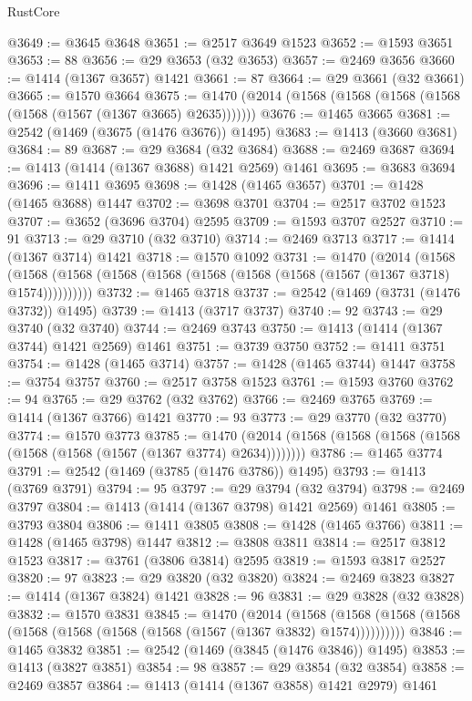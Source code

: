 \begin{lexlean}{RustCore}
\begin{coremodule}
{\begin{coremodule}
{{{{{{{{{{{{{{{{{{{{{{{{{{{{{{{{{{{{{{{{{{{{{{{@3649 := @3645 @3648
@3651 := @2517 @3649 @1523
@3652 := @1593 @3651
@3653 := 88
@3656 := @29 @3653 (@32 @3653)
@3657 := @2469 @3656
@3660 := @1414 (@1367 @3657) @1421
@3661 := 87
@3664 := @29 @3661 (@32 @3661)
@3665 := @1570 @3664
@3675 := @1470 (@2014 (@1568 (@1568 (@1568 (@1568 (@1568 (@1567 (@1367 @3665) @2635)))))))
@3676 := @1465 @3665
@3681 := @2542 (@1469 (@3675 (@1476 @3676)) @1495)
@3683 := @1413 (@3660 @3681)
@3684 := 89
@3687 := @29 @3684 (@32 @3684)
@3688 := @2469 @3687
@3694 := @1413 (@1414 (@1367 @3688) @1421 @2569) @1461
@3695 := @3683 @3694
@3696 := @1411 @3695
@3698 := @1428 (@1465 @3657)
@3701 := @1428 (@1465 @3688) @1447
@3702 := @3698 @3701
@3704 := @2517 @3702 @1523
@3707 := @3652 (@3696 @3704) @2595
@3709 := @1593 @3707 @2527
@3710 := 91
@3713 := @29 @3710 (@32 @3710)
@3714 := @2469 @3713
@3717 := @1414 (@1367 @3714) @1421
@3718 := @1570 @1092
@3731 := @1470
    (@2014
      (@1568 (@1568 (@1568 (@1568 (@1568 (@1568 (@1568 (@1568 (@1567 (@1367 @3718) @1574))))))))))
@3732 := @1465 @3718
@3737 := @2542 (@1469 (@3731 (@1476 @3732)) @1495)
@3739 := @1413 (@3717 @3737)
@3740 := 92
@3743 := @29 @3740 (@32 @3740)
@3744 := @2469 @3743
@3750 := @1413 (@1414 (@1367 @3744) @1421 @2569) @1461
@3751 := @3739 @3750
@3752 := @1411 @3751
@3754 := @1428 (@1465 @3714)
@3757 := @1428 (@1465 @3744) @1447
@3758 := @3754 @3757
@3760 := @2517 @3758 @1523
@3761 := @1593 @3760
@3762 := 94
@3765 := @29 @3762 (@32 @3762)
@3766 := @2469 @3765
@3769 := @1414 (@1367 @3766) @1421
@3770 := 93
@3773 := @29 @3770 (@32 @3770)
@3774 := @1570 @3773
@3785 := @1470 (@2014 (@1568 (@1568 (@1568 (@1568 (@1568 (@1568 (@1567 (@1367 @3774) @2634))))))))
@3786 := @1465 @3774
@3791 := @2542 (@1469 (@3785 (@1476 @3786)) @1495)
@3793 := @1413 (@3769 @3791)
@3794 := 95
@3797 := @29 @3794 (@32 @3794)
@3798 := @2469 @3797
@3804 := @1413 (@1414 (@1367 @3798) @1421 @2569) @1461
@3805 := @3793 @3804
@3806 := @1411 @3805
@3808 := @1428 (@1465 @3766)
@3811 := @1428 (@1465 @3798) @1447
@3812 := @3808 @3811
@3814 := @2517 @3812 @1523
@3817 := @3761 (@3806 @3814) @2595
@3819 := @1593 @3817 @2527
@3820 := 97
@3823 := @29 @3820 (@32 @3820)
@3824 := @2469 @3823
@3827 := @1414 (@1367 @3824) @1421
@3828 := 96
@3831 := @29 @3828 (@32 @3828)
@3832 := @1570 @3831
@3845 := @1470
    (@2014
      (@1568 (@1568 (@1568 (@1568 (@1568 (@1568 (@1568 (@1568 (@1567 (@1367 @3832) @1574))))))))))
@3846 := @1465 @3832
@3851 := @2542 (@1469 (@3845 (@1476 @3846)) @1495)
@3853 := @1413 (@3827 @3851)
@3854 := 98
@3857 := @29 @3854 (@32 @3854)
@3858 := @2469 @3857
@3864 := @1413 (@1414 (@1367 @3858) @1421 @2979) @1461
}}}}}}}}}}}}}}}}}}}}}}}}}}}}}}}}}}}}}}}}}}}}}}}
\end{coremodule}}
\end{coremodule}
\end{lexlean}
